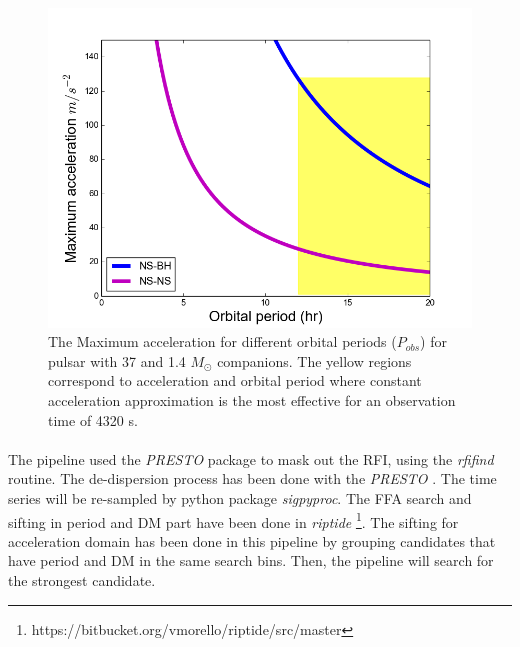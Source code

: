 \documentclass[thesis_msc.tex]{subfiles}
\begin{document}
\begin{figure}[h] \centering
\includegraphics[width=1.0\textwidth]{figures/acc_plot.png}
\caption{The Maximum acceleration for different orbital periods ($P_{obs}$) for pulsar with 37 and 1.4 $M_\odot$ companions. The yellow regions correspond to acceleration and orbital period where constant acceleration approximation is the most effective for an observation time of 4320 s. }
\label{Fig:acc_range}
\end{figure}


\paragraph{} The pipeline used the  \textit{PRESTO} package to mask out the RFI, using the \textit{rfifind} routine. The de-dispersion process has been done with the \textit{PRESTO} . The time series will be re-sampled by python package \textit{sigpyproc}. The FFA search and sifting in period and DM part have been done in \textit{riptide} \footnote{https://bitbucket.org/vmorello/riptide/src/master}. The sifting for acceleration domain has been done in this pipeline by grouping candidates that have period and DM in the same search bins. Then, the pipeline will search for the strongest candidate. 
\\
\end{document}
